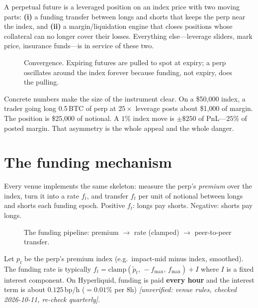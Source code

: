 \begin{principle}
A perpetual future is a leveraged position on an index price with two moving parts:
\textbf{(i)} a funding transfer between longs and shorts that keeps the perp near the index,
and \textbf{(ii)} a margin/liquidation engine that closes positions whose collateral can no
longer cover their losses. Everything else---leverage sliders, mark price, insurance funds---is
in service of these two.
\end{principle}

\begin{figure}[htbp]\centering

\caption{Convergence. Expiring futures are pulled to spot at expiry; a perp oscillates around
the index forever because funding, not expiry, does the pulling.}
\label{fig:perpexpiry}
\end{figure}

Concrete numbers make the size of the instrument clear. On a \$50{,}000 index, a trader going
long 0.5\,BTC of perp at $25\times$ leverage posts about \$1{,}000 of margin. The position is
\$25{,}000 of notional. A $1\%$ index move is $\pm\$250$ of PnL---$25\%$ of posted margin.
That asymmetry is the whole appeal and the whole danger.

\section{The funding mechanism}\label{sec:funding}

Every venue implements the same skeleton: measure the perp's \emph{premium} over the index,
turn it into a rate $f_t$, and transfer $f_t$ per unit of notional between longs and shorts each
funding epoch. Positive $f_t$: longs pay shorts. Negative: shorts pay longs.

\begin{figure}[htbp]\centering

\caption{The funding pipeline: premium $\to$ rate (clamped) $\to$ peer-to-peer transfer.}
\label{fig:fundflow}
\end{figure}

\begin{principle}
Let $p_t$ be the perp's premium index (e.g.\ impact-mid minus index, smoothed). The funding rate
is typically $f_t = \mathrm{clamp}(\tilde p_t,\,-f_{\max},\,f_{\max}) + I$ where $I$ is a fixed
interest component. On Hyperliquid, funding is paid \textbf{every hour} and the interest term is
about $0.125$\,bp/h ($=0.01\%$ per $8$h) \emph{[unverified: venue rules, checked 2026-10-11,
re-check quarterly]}.
\end{principle}

